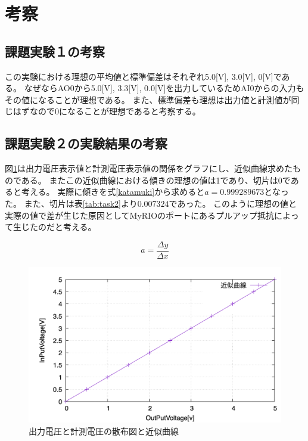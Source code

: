 \documentclass[11pt,dvipdfmx]{jarticle}
\begin{document}
\section{考察}
	\subsection{課題実験１の考察}
	この実験における理想の平均値と標準偏差はそれぞれ5.0[V], 3.0[V], 0[V]である。
	なぜならAO0から5.0[V], 3.3[V], 0.0[V]を出力しているためAI0からの入力もその値になることが理想である。
	また、標準偏差も理想は出力値と計測値が同じはずなので0になることが理想であると考察する。

	\subsection{課題実験２の実験結果の考察}
	図\ref{fig:kinji}は出力電圧表示値と計測電圧表示値の関係をグラフにし、近似曲線求めたものである。
	またこの近似曲線における傾きの理想の値は1であり、切片は0であると考える。
	実際に傾きを式\ref{katamuki}から求めると$a=0.999289673$となった。
	また、切片は表\ref{tab:task2}より$0.007324$であった。
	このように理想の値と実際の値で差が生じた原因としてMyRIOのポートにあるプルアップ抵抗によって生じたのだと考える。


	\begin{equation}
		a=\frac{\Delta y}{\Delta x}
		\label{katamuki}
	\end{equation}

	
	\begin{figure}[H]
		\centering
		\includegraphics[keepaspectratio,scale=0.25]{m20060/kinji.png}
		\caption{出力電圧と計測電圧の散布図と近似曲線}
		\label{fig:kinji}
	\end{figure}
\end{document}
